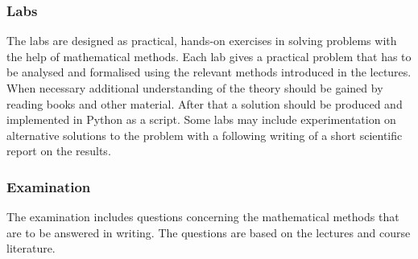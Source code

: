 \documentclass[11pt]{article}
\begin{document}
\subsubsection*{Labs}
The labs are designed as practical, hands-on exercises in solving
problems with the help of mathematical methods. Each lab gives a
practical problem that has to be analysed and formalised using the
relevant methods introduced in the lectures. When necessary additional
understanding of the theory should be gained by reading books and
other material. After that a solution should be produced and
implemented in Python as a script. Some labs may include
experimentation on alternative solutions to the problem with a
following writing of a short scientific report on the results.

\subsubsection*{Examination}
The examination includes questions concerning the mathematical methods
that are to be answered in writing. The questions are based on the
lectures and course literature.
\end{document}
